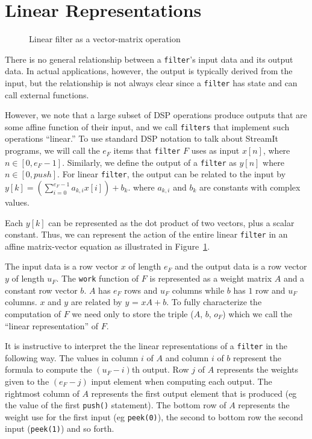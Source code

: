 \section{Linear Representations}
\begin{figure}
\center
\epsfxsize=3.0in
\caption{Linear filter as a vector-matrix operation}
\label{fig:overview-matrix}
\vspace{-12pt}
\end{figure}

There is no general relationship between a {\tt filter}'s input data and
its output data. In actual applications, however, the output is typically 
derived from the input, but the relationship is not always clear 
since a {\tt filter} has state and can call external functions.

However, we note that a large subset of DSP operations produce outputs
that are some affine function of their input, and we call {\tt filters} that 
implement such operations ``linear.'' To use standard DSP notation to talk about
StreamIt programs, we will call the $e_F$ items that {\tt filter} $F$ uses as input
$x[n]$, where  $n\in[0,e_F-1]$. Similarly, we  
define the output of a {\tt filter} as $y[n]$ where  $n\in[0,push]$. For 
linear {\tt filter}, the output can be related to the input by 
$y[k] = (\sum_{i=0}^{e_F-1} a_{k,i}x[i])+b_k$.
where $a_{k,i}$ and $b_{k}$ are constants with complex values. 

Each $y[k]$ can be represented as the dot product of two vectors, plus a scalar constant. 
Thus, we can represent the action of the entire linear {\tt filter} 
in an affine matrix-vector equation as illustrated in 
Figure~\ref{fig:overview-matrix}.

The input data is a row vector $x$ of length $e_F$
and the output data is a row vector $y$ of length $u_F$. The {\tt work} function
of $F$ is represented as a weight matrix $A$ and a constant row vector $b$. 
$A$ has $e_F$ rows and $u_F$ columns while $b$ has $1$ row and $u_F$ columns. 
$x$ and $y$ are related by $y$ = $xA + b$. To fully characterize the computation of $F$ 
we need only to store the triple ($A$, $b$, $o_F$) which we call 
the ``linear representation'' of $F$.

It is instructive to interpret the the linear representations of a {\tt filter}
in the following way. The values in column $i$ of $A$ and column $i$ of $b$ 
represent the formula to compute the $(u_F-i)$th output. 
Row $j$ of $A$ represents the weights given to the $(e_F-j)$ input element 
when computing each output. The rightmost column of $A$ represents the first output element 
that is produced (eg the value of the first {\tt push()} statement). The bottom row 
of $A$ represents the weight use for the first input 
(eg {\tt peek(0)}), the second to bottom row the second input ({\tt peek(1)}) and so forth.




